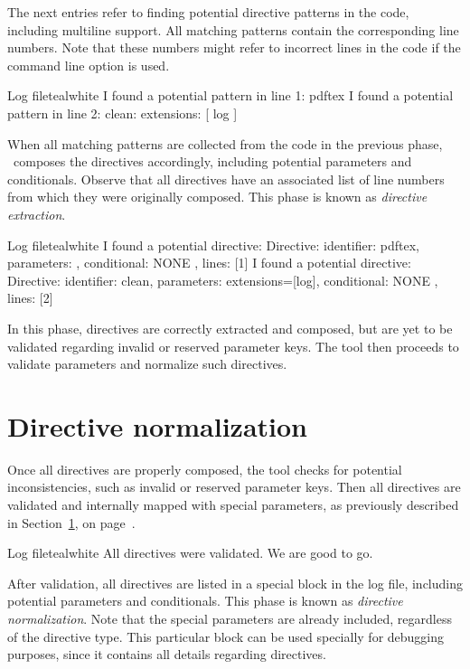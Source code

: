 The next entries refer to finding potential directive patterns in the code, including multiline support. All matching patterns contain the corresponding line numbers. Note that these numbers might refer to incorrect lines in the code if the  command line option is used.

\begin{codebox}{Log file}{teal}{\icnote}{white}
I found a potential pattern in line 1: pdftex
I found a potential pattern in line 2: clean: { extensions: [ log ] }
\end{codebox}

When all matching patterns are collected from the code in the previous phase, \arara\ composes the directives accordingly, including potential parameters and conditionals. Observe that all directives have an associated list of line numbers from which they were originally composed. This phase is known as \emph{directive extraction}.

\begin{codebox}{Log file}{teal}{\icnote}{white}
I found a potential directive: Directive: { identifier: pdftex,
parameters: {}, conditional: { NONE }, lines: [1] }
I found a potential directive: Directive: { identifier: clean,
parameters: {extensions=[log]}, conditional: { NONE }, lines: [2] }
\end{codebox}

In this phase, directives are correctly extracted and composed, but are yet to be validated regarding invalid or reserved parameter keys. The tool then proceeds to validate parameters and normalize such directives.

\section{Directive normalization}
\label{sec:directivenormalization}

Once all directives are properly composed, the tool checks for potential inconsistencies, such as invalid or reserved parameter keys. Then all directives are validated and internally mapped with special parameters, as previously described in Section~\ref{sec:directivenormalization}, on page~\pageref{sec:directivenormalization}.

\begin{codebox}{Log file}{teal}{\icnote}{white}
All directives were validated. We are good to go.
\end{codebox}

After validation, all directives are listed in a special block in the log file, including potential parameters and conditionals. This phase is known as \emph{directive normalization}. Note that the special parameters are already included, regardless of the directive type.  This particular block can be used specially for debugging purposes, since it contains all details regarding directives.

